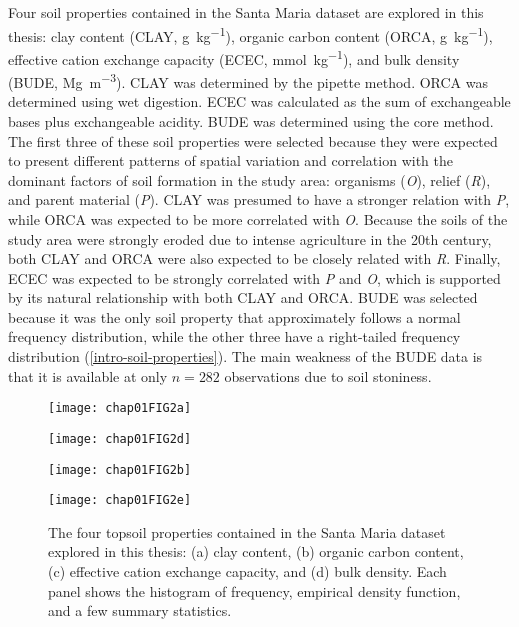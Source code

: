 Four soil properties contained in the Santa Maria dataset are explored in this thesis: clay content
(CLAY, \si{\gram\per\kilo\gram}), organic carbon content (ORCA, \si{\gram\per\kilo\gram}), 
effective cation exchange capacity (ECEC, \si{\milli\mole\per\kilo\gram}), and bulk density 
(BUDE, \si{\mega\gram\per\cubic\metre}). CLAY was 
determined by the pipette method. ORCA was determined using wet digestion. ECEC was calculated as 
the sum of exchangeable bases plus exchangeable acidity. BUDE was determined using the core method. 
The first three of these soil properties were selected because they were expected to present 
different patterns of spatial variation and correlation with the dominant factors of soil formation 
in the study area: organisms (\textit{O}), relief (\textit{R}), and parent material (\textit{P}). 
CLAY was presumed to have a stronger relation with \textit{P}, while ORCA was expected to be more 
correlated with \textit{O}. Because the soils of the study area were strongly eroded due to intense 
agriculture in the 20th century, both CLAY and ORCA were also expected to be closely related with 
\textit{R}. Finally, ECEC was expected to be strongly correlated with \textit{P} and \textit{O}, 
which is supported by its natural relationship with both CLAY and ORCA. BUDE was selected because it
was the only soil property that approximately follows a normal frequency distribution, while the 
other three have a right-tailed frequency distribution (\autoref{intro-soil-properties}). The main 
weakness of the BUDE data is that it is available at only $n = 282$ observations due to soil stoniness.

 \begin{figure}[!ht]
   \centering
    \begin{minipage}[b]{63mm}
      \subcaption{}
      \centering
      \texttt{[image: chap01FIG2a]}
    \end{minipage}
    \begin{minipage}[b]{63mm}
      \subcaption{}
      \centering
      \texttt{[image: chap01FIG2d]}
    \end{minipage}
    \begin{minipage}[b]{63mm}
      \subcaption{}
      \centering
      \texttt{[image: chap01FIG2b]}
    \end{minipage}
    \begin{minipage}[b]{63mm}
      \subcaption{}
      \centering
      \texttt{[image: chap01FIG2e]}
    \end{minipage}
  \caption{The four topsoil properties contained in the Santa Maria dataset explored in this thesis:
  (a) clay content, (b) organic carbon content, (c) effective cation exchange capacity, and (d)
  bulk density. Each panel shows the histogram of frequency, empirical density function, and a few 
  summary statistics.}
  \label{fig:intro-soil-properties}
 \end{figure}

